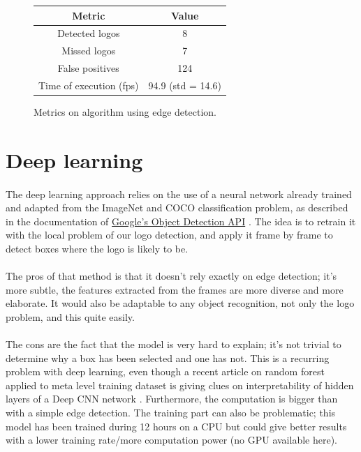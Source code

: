 \documentclass[12pt]{article}%
\begin{document}
\begin{figure}
    \centering
        \begin{tabular}{c | c}
        Metric                  & Value \\
        \hline
        Detected logos          & 8 \\
        Missed logos            & 7 \\
        False positives         & 124 \\
        Time of execution (fps) & 94.9 (std = 14.6) \\
        \end{tabular}
    \caption{Metrics on algorithm using edge detection.}
    \label{fig:edgeResults}
\end{figure}


\section{Deep learning}

\paragraph{}
The deep learning approach relies on the use of a neural network already trained and adapted from the ImageNet and COCO classification problem, as described in the documentation of \href{https://github.com/tensorflow/models/tree/master/research/object_detection}{Google's Object Detection API} \cite{googleAPI}.
The idea is to retrain it with the local problem of our logo detection, and apply it frame by frame to detect boxes where the logo is likely to be.

\paragraph{}
The pros of that method is that it doesn't rely exactly on edge detection; it's more subtle, the features extracted from the frames are more diverse and more elaborate. It would also be adaptable to any object recognition, not only the logo problem, and this quite easily.

\paragraph{}
The cons are the fact that the model is very hard to explain; it's not trivial to determine why a box has been selected and one has not. This is a recurring problem with deep learning, even though a recent article on random forest applied to meta level training dataset is giving clues on interpretability  of hidden layers of a Deep CNN network \cite{interpretability}. Furthermore, the computation is bigger than with a simple edge detection. The training part can also be problematic; this model has been trained during 12 hours on a CPU but could give better results with a lower training rate/more computation power (no GPU available here).
\end{document}
